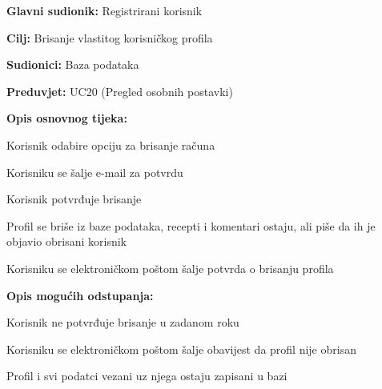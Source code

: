 					\noindent {}
					\begin{packed_item}
						
						\item \textbf{Glavni sudionik: }Registrirani korisnik
						\item \textbf{Cilj: }Brisanje vlastitog korisničkog profila
						\item \textbf{Sudionici: }Baza podataka
						\item \textbf{Preduvjet: }UC20 (Pregled osobnih postavki)
						\item \textbf{Opis osnovnog tijeka:}
						
						\item[] \begin{packed_enum}
							\item Korisnik odabire opciju za brisanje računa
							\item Korisniku se šalje e-mail za potvrdu
							\item Korisnik potvrđuje brisanje
							\item Profil se briše iz baze podataka, recepti i komentari ostaju, ali piše da ih je objavio obrisani korisnik
							\item Korisniku se elektroničkom poštom šalje potvrda o brisanju profila
						\end{packed_enum}
						\item \textbf{Opis mogućih odstupanja:}
						\item[] \begin{packed_enum}
							\item[3.a] Korisnik ne potvrđuje brisanje u zadanom roku
							\begin{packed_enum}
								\item[1.] Korisniku se elektroničkom poštom šalje obavijest da profil nije obrisan
								\item[2.] Profil i svi podatci vezani uz njega ostaju zapisani u bazi
							\end{packed_enum}
						\end{packed_enum}
					\end{packed_item}
										
